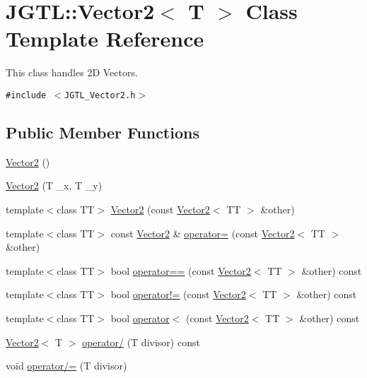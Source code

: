 \hypertarget{class_j_g_t_l_1_1_vector2}{
\section{JGTL::Vector2$<$ T $>$ Class Template Reference}
\label{class_j_g_t_l_1_1_vector2}
}
This class handles 2D Vectors.  


{\tt \#include $<$JGTL\_\-Vector2.h$>$}

\subsection*{Public Member Functions}
\begin{CompactItemize}
\item 
\hyperlink{class_j_g_t_l_1_1_vector2_9dfa1d4fc791920450349e2c677c371a}{Vector2} ()
\item 
\hyperlink{class_j_g_t_l_1_1_vector2_c4221fdd7e9e3aa006c89c3acef84024}{Vector2} (T \_\-x, T \_\-y)
\item 
template$<$class TT$>$ \hyperlink{class_j_g_t_l_1_1_vector2_1441055d7e5df37f25501a9dc7f9b08f}{Vector2} (const \hyperlink{class_j_g_t_l_1_1_vector2}{Vector2}$<$ TT $>$ \&other)
\item 
template$<$class TT$>$ const \hyperlink{class_j_g_t_l_1_1_vector2}{Vector2} \& \hyperlink{class_j_g_t_l_1_1_vector2_0595c857bb73aa35acceee677fe72d2d}{operator=} (const \hyperlink{class_j_g_t_l_1_1_vector2}{Vector2}$<$ TT $>$ \&other)
\item 
template$<$class TT$>$ bool \hyperlink{class_j_g_t_l_1_1_vector2_62f44ba61eaea3f9b66d8eae10c08d39}{operator==} (const \hyperlink{class_j_g_t_l_1_1_vector2}{Vector2}$<$ TT $>$ \&other) const 
\item 
template$<$class TT$>$ bool \hyperlink{class_j_g_t_l_1_1_vector2_46d43cf2f34da5ef6cd7cdb557e8cb65}{operator!=} (const \hyperlink{class_j_g_t_l_1_1_vector2}{Vector2}$<$ TT $>$ \&other) const 
\item 
template$<$class TT$>$ bool \hyperlink{class_j_g_t_l_1_1_vector2_c9de5511a6a307af0e4a1de5211e551d}{operator$<$} (const \hyperlink{class_j_g_t_l_1_1_vector2}{Vector2}$<$ TT $>$ \&other) const 
\item 
\hyperlink{class_j_g_t_l_1_1_vector2}{Vector2}$<$ T $>$ \hyperlink{class_j_g_t_l_1_1_vector2_70a0c52f426b71ec1bf352b840a8ff6c}{operator/} (T divisor) const
\item 
void \hyperlink{class_j_g_t_l_1_1_vector2_2cc09a9baa2ae84426f750ed2d50be0e}{operator/=} (T divisor)
\item 

\end{CompactItemize}

